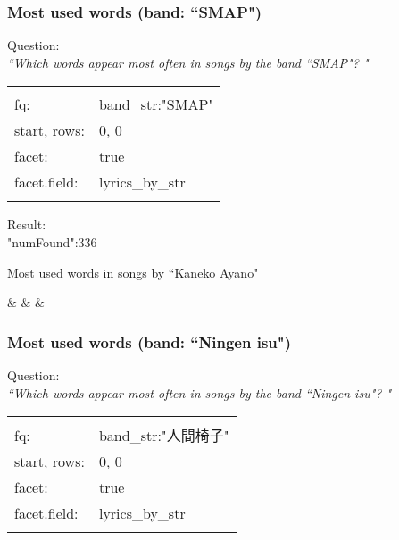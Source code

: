 \bigskip
\subsubsection{Most used words (band: ``SMAP")}

Question: \\
\emph{``Which words appear most often in songs by the band ``SMAP"? "} \\


\begin{tabular}{| l |  l |}
	\hline
	& \\
	fq: & band\_str:"SMAP" \\
	start, rows: & 0, 0 \\
	facet: & true \\
	facet.field: & lyrics\_by\_str \\
	& \\
	\hline
\end{tabular}

\bigskip
Result: \\

"numFound":336

\begin{myLongTable}{Most used words in songs by ``Kaneko Ayano"}
	
	& & & \\
\end{myLongTable}


\bigskip
\bigskip


\newpage




\subsubsection{Most used words (band: ``Ningen isu")} \label{most-used-words-Ningen-Isu}

Question: \\
\emph{``Which words appear most often in songs by the band ``Ningen isu"? "} \\


\begin{tabular}{|l|l|}
	\hline
	& \\
	fq: & band\_str:"人間椅子" \\
	start, rows: & 0, 0 \\
	facet: & true \\
	facet.field: & lyrics\_by\_str \\
	& \\
	\hline
\end{tabular}


